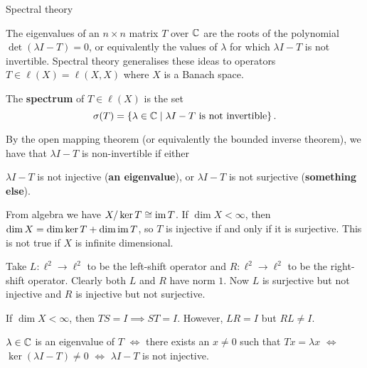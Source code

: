 Spectral theory

The eigenvalues of an $n \times n$ matrix $T$ over $\mathbb{C}$ are the roots of the polynomial $\det(\lambda I-T)=0$, or equivalently the values of $\lambda$ for which $\lambda I-T$ is not invertible.
Spectral theory generalises these ideas to operators $T \in \ell(X) = \ell(X,X)$ where $X$ is a Banach space.

\begin{defn}
  The \textbf{spectrum} of $T \in \ell(X)$ is the set
  \[ \sigma(T) = \left\{ \lambda \in \mathbb{C} \mid \lambda I-T \text{ is not invertible} \right\}. \]
\end{defn}

\begin{rmk}
  \leavevmode
  \begin{enum}
    \io
    By the open mapping theorem (or equivalently the bounded inverse theorem), we have that $\lambda I-T$ is non-invertible if either
    \begin{enum}
    \io $\lambda I-T$ is not injective (\textbf{an eigenvalue}), or
    \io $\lambda I-T$ is not surjective (\textbf{something else}).
    \end{enum}

    \io
    From algebra we have $X/\ker T \cong \operatorname{im} T$.
    If $\dim X < \infty$, then $\dim X = \dim\ker T + \dim\operatorname{im} T$, so $T$ is injective if and only if it is surjective.
    This is not true if $X$ is infinite dimensional.

    Take $L: \ell^2 \to \ell^2$ to be the left-shift operator and $R: \ell^2 \to \ell^2$ to be the right-shift operator.
    Clearly both $L$ and $R$ have norm $1$.
    Now $L$ is surjective but not injective and $R$ is injective but not surjective.

    \io
    If $\dim X<\infty$, then $TS=I \implies ST=I$.
    However, $LR=I$ but $RL \neq I$.

    \io
    $\lambda \in \mathbb{C}$ is an eigenvalue of $T$ $\iff$ there exists an $x \neq 0$ such that $Tx=\lambda x$ $\iff$ $\ker(\lambda I-T) \neq 0$ $\iff$ $\lambda I-T$ is not injective.
  \end{enum}
\end{rmk}
